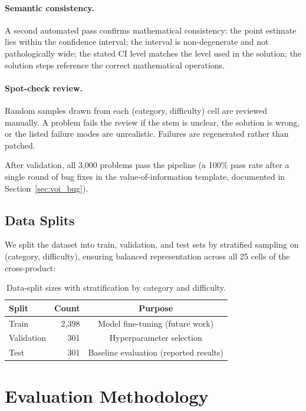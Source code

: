 \documentclass{article}
\begin{document}
\paragraph{Semantic consistency.} A second automated pass confirms mathematical consistency: the point estimate lies within the confidence interval; the interval is non-degenerate and not pathologically wide; the stated CI level matches the level used in the solution; the solution steps reference the correct mathematical operations.

\paragraph{Spot-check review.} Random samples drawn from each (category, difficulty) cell are reviewed manually. A problem fails the review if the stem is unclear, the solution is wrong, or the listed failure modes are unrealistic. Failures are regenerated rather than patched.

After validation, all 3{,}000 problems pass the pipeline (a 100\% pass rate after a single round of bug fixes in the value-of-information template, documented in Section~\ref{sec:voi_bug}).

\subsection{Data Splits}

We split the dataset into train, validation, and test sets by stratified sampling on (category, difficulty), ensuring balanced representation across all 25 cells of the cross-product:

\begin{table}[h]
\centering
\caption{Data-split sizes with stratification by category and difficulty.}
\label{tab:splits}
\begin{tabular}{lrc}
\toprule
\textbf{Split} & \textbf{Count} & \textbf{Purpose} \\
\midrule
Train & 2{,}398 & Model fine-tuning (future work) \\
Validation & 301 & Hyperparameter selection \\
Test & 301 & Baseline evaluation (reported results) \\
\bottomrule
\end{tabular}
\end{table}


\section{Evaluation Methodology}
\label{sec:evaluation}
\end{document}
